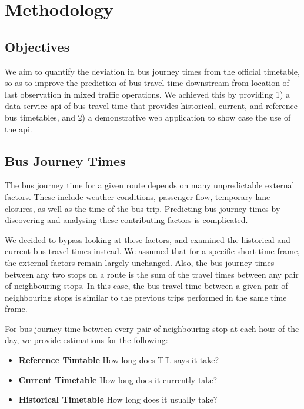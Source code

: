 \chapter{Methodology}
\label{ch:concept_design}
\section{Objectives}
\par We aim to quantify the deviation in bus journey times from the official timetable, so as to improve the prediction of bus travel time downstream from location of last observation in mixed traffic operations. We achieved this by providing 1) a data service \acrshort{api} of bus travel time that provides historical, current, and reference bus timetables, and 2) a demonstrative web application to show case the use of the \acrshort{api}.

\section{Bus Journey Times}
\par The bus journey time for a given route depends on many unpredictable external factors. These include weather conditions, passenger flow, temporary lane closures, as well as the time of the bus trip. Predicting bus journey times by discovering and analysing these contributing factors is complicated.

\par We decided to bypass looking at these factors, and examined the historical and current bus travel times instead. We assumed that for a specific short time frame, the external factors remain largely unchanged. Also, the bus journey times between any two stops on a route is the sum of the travel times between any pair of neighbouring stops. In this case, the bus travel time between a given pair of neighbouring stops is similar to the previous trips performed in the same time frame.

\par For bus journey time between every pair of neighbouring stop at each hour of the day, we provide estimations for the following:
\begin{itemize}
  \item \textbf{Reference Timtable} How long does TfL says it take?
  \item \textbf{Current Timetable} How long does it currently take?
  \item \textbf{Historical Timetable} How long does it usually take?
\end{itemize}

